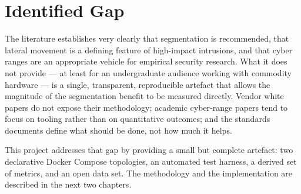 \section{Identified Gap}

The literature establishes very clearly that segmentation is recommended, that lateral movement is a defining feature of high-impact intrusions, and that cyber ranges are an appropriate vehicle for empirical security research. What it does not provide --- at least for an undergraduate audience working with commodity hardware --- is a single, transparent, reproducible artefact that allows the magnitude of the segmentation benefit to be measured directly. Vendor white papers do not expose their methodology; academic cyber-range papers tend to focus on tooling rather than on quantitative outcomes; and the standards documents define what should be done, not how much it helps.

This project addresses that gap by providing a small but complete artefact: two declarative Docker Compose topologies, an automated test harness, a derived set of metrics, and an open data set. The methodology and the implementation are described in the next two chapters.
